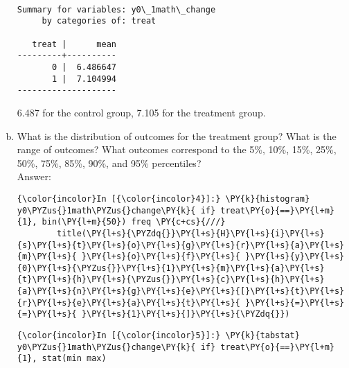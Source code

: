 \documentclass[11pt,notitlepage]{article}\usepackage[]{graphicx}\usepackage[]{color}
\makeatletter
\newenvironment{kframe}{%
 \def\at@end@of@kframe{}%
 \ifinner\ifhmode%
  \def\at@end@of@kframe{\end{minipage}}%
  \begin{minipage}{\columnwidth}%
 \fi\fi%
 \def\FrameCommand##1{\hskip\@totalleftmargin \hskip-\fboxsep
 \colorbox{shadecolor}{##1}\hskip-\fboxsep
     \hskip-\linewidth \hskip-\@totalleftmargin \hskip\columnwidth}%
 \MakeFramed {\advance\hsize-\width
   \@totalleftmargin\z@ \linewidth\hsize
   \@setminipage}}%
 {\par\unskip\endMakeFramed%
 \at@end@of@kframe}
\newenvironment{knitrout}{}{} %
\makeatother
\begin{document}
\begin{enumerate}[a)]
\begin{knitrout}
\begin{kframe}
    \begin{Verbatim}[commandchars=\\\{\}]

Summary for variables: y0\_1math\_change
     by categories of: treat 

   treat |      mean
---------+----------
       0 |  6.486647
       1 |  7.104994
--------------------

    \end{Verbatim}
\end{kframe}
\end{knitrout}


6.487 for the control group, 7.105 for the treatment group. 

\item What is the distribution of outcomes for the treatment group? What is the range of outcomes? What outcomes correspond to the 5\%, 10\%, 15\%, 25\%, 50\%, 75\%, 85\%, 90\%, and 95\% percentiles?\\
Answer:\\

\begin{knitrout}
\color{fgcolor}\begin{kframe}

    \begin{Verbatim}[commandchars=\\\{\}]
{\color{incolor}In [{\color{incolor}4}]:} \PY{k}{histogram} y0\PYZus{}1math\PYZus{}change\PY{k}{ if} treat\PY{o}{==}\PY{l+m}{1}, bin(\PY{l+m}{50}) freq \PY{c+cs}{///}
        title(\PY{l+s}{\PYZdq{}}\PY{l+s}{H}\PY{l+s}{i}\PY{l+s}{s}\PY{l+s}{t}\PY{l+s}{o}\PY{l+s}{g}\PY{l+s}{r}\PY{l+s}{a}\PY{l+s}{m}\PY{l+s}{ }\PY{l+s}{o}\PY{l+s}{f}\PY{l+s}{ }\PY{l+s}{y}\PY{l+s}{0}\PY{l+s}{\PYZus{}}\PY{l+s}{1}\PY{l+s}{m}\PY{l+s}{a}\PY{l+s}{t}\PY{l+s}{h}\PY{l+s}{\PYZus{}}\PY{l+s}{c}\PY{l+s}{h}\PY{l+s}{a}\PY{l+s}{n}\PY{l+s}{g}\PY{l+s}{e}\PY{l+s}{[}\PY{l+s}{t}\PY{l+s}{r}\PY{l+s}{e}\PY{l+s}{a}\PY{l+s}{t}\PY{l+s}{ }\PY{l+s}{=}\PY{l+s}{=}\PY{l+s}{ }\PY{l+s}{1}\PY{l+s}{]}\PY{l+s}{\PYZdq{}})
\end{Verbatim}
    

    \begin{Verbatim}[commandchars=\\\{\}]
{\color{incolor}In [{\color{incolor}5}]:} \PY{k}{tabstat} y0\PYZus{}1math\PYZus{}change\PY{k}{ if} treat\PY{o}{==}\PY{l+m}{1}, stat(min max)
\end{Verbatim}

    \begin{Verbatim}[commandchars=\\\{\}]


\end{Verbatim}
\end{kframe}
\end{knitrout}
\end{enumerate}
\end{document}
